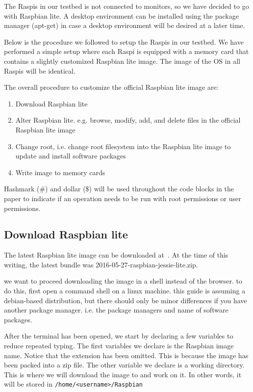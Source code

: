 The \ac{Raspi}s in our testbed is not connected to monitors, so we
have decided to go with Raspbian lite.
A desktop environment can be installed using the package manager
(apt-get) in case a desktop environment will be desired at a later
time.

Below is the procedure we followed to setup the \ac{Raspi}s in our testbed. We
have performed a simple setup where each \ac{Raspi} is equipped with a
memory card that contains a slightly customized Raspbian lite image. The image
of the \ac{OS} in all \ac{Raspi}s will be identical.

The overall procedure to customize the official Raspbian lite image
are:
\begin{enumerate}
    \item Download Raspbian lite
    \item Alter Raspbian lite. e.g. browse, modify, add, and delete files
        in the official Raspbian lite image
    \item Change root, i.e. change root filesystem into the Raspbian lite
        image to update and install software packages
    \item Write image to memory cards
\end{enumerate}

Hashmark (\#) and dollar (\$) will be used throughout the code blocks in
the paper to indicate if an operation needs to be run with root permissions or
user permissions.

\subsection{Download Raspbian lite}

The latest Raspbian lite image can be downloaded at~\cite{raspbian}.
At the time of this writing, the latest bundle was
2016-05-27-raspbian-jessie-lite.zip.

we want to proceed downloading the image in a shell instead of the browser.
to do this, first open a command shell on a linux machine. this guide is
assuming a debian-based distribution, but there should only be minor differences
if you have another package manager. i.e. the package managers and name of software packages.

After the terminal has been opened, we start by declaring a few variables to reduce
repeated typing. The first variables we declare is the Raspbian image name.
Notice that the extension has been omitted. This is because the image has been
packed into a zip file. The other variable we declare is a working directory.
This is where we will download the image to and work on it. In other words, it
will be stored in \texttt{/home/<username>/Raspbian}

